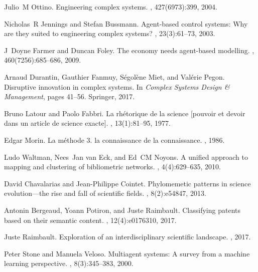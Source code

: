\documentclass[runningheads,a4paper]{llncs}
\begin{document}
\begin{thebibliography}{10}
Julio~M Ottino.
\newblock Engineering complex systems.
, 427(6973):399, 2004.

Nicholas~R Jennings and Stefan Bussmann.
\newblock Agent-based control systems: Why are they suited to engineering
  complex systems?
, 23(3):61--73, 2003.

J~Doyne Farmer and Duncan Foley.
\newblock The economy needs agent-based modelling.
, 460(7256):685--686, 2009.

Arnaud Durantin, Gauthier Fanmuy, S{\'e}gol{\`e}ne Miet, and Val{\'e}rie Pegon.
\newblock Disruptive innovation in complex systems.
\newblock In {\em Complex Systems Design \& Management}, pages 41--56.
  Springer, 2017.

Bruno Latour and Paolo Fabbri.
\newblock La rh{\'e}torique de la science [pouvoir et devoir dans un article de
  science exacte].
, 13(1):81--95, 1977.

Edgar Morin.
\newblock La m{\'e}thode 3. la connaissance de la connaissance.
, 1986.

Ludo Waltman, Nees~Jan van Eck, and Ed~CM Noyons.
\newblock A unified approach to mapping and clustering of bibliometric
  networks.
, 4(4):629--635, 2010.

David Chavalarias and Jean-Philippe Cointet.
\newblock Phylomemetic patterns in science evolution---the rise and fall of
  scientific fields.
, 8(2):e54847, 2013.

Antonin Bergeaud, Yoann Potiron, and Juste Raimbault.
\newblock Classifying patents based on their semantic content.
, 12(4):e0176310, 2017.

Juste Raimbault.
\newblock Exploration of an interdisciplinary scientific landscape.
, 2017.

Peter Stone and Manuela Veloso.
\newblock Multiagent systems: A survey from a machine learning perspective.
, 8(3):345--383, 2000.


\end{thebibliography}
\end{document}
